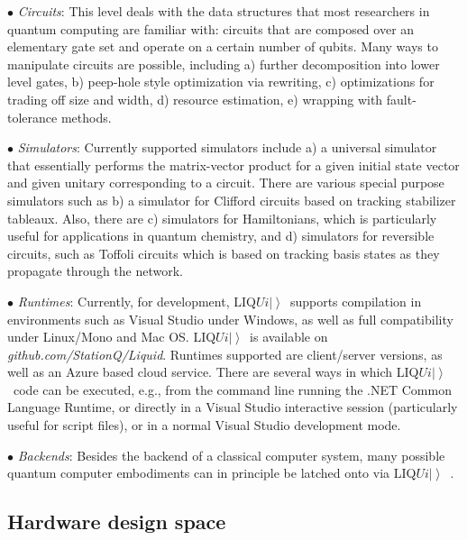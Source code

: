 \documentclass[conference]{IEEEtran}
\newcommand{\ket}[1]{\left| #1\right\rangle}        %
\newcommand{\Liquid}{LIQ$Ui\ket{}$\ }
\begin{document}
\noindent $\bullet$ {\em Circuits}: This level deals with the data structures that most researchers in quantum computing are familiar with: circuits that are composed over an elementary gate set and operate on a certain number of qubits. Many ways to manipulate circuits are possible, including a) further decomposition into lower level gates, b) peep-hole style optimization via rewriting, c) optimizations for trading off size and width, d) resource estimation, e) wrapping with fault-tolerance methods. 


\noindent $\bullet$ {\em Simulators}: Currently supported simulators include a) a universal simulator that essentially performs the matrix-vector product for a given initial state vector and given unitary corresponding to a circuit. %
There are various special purpose simulators such as b) a simulator for Clifford circuits based on tracking stabilizer tableaux. Also, there are c) simulators for Hamiltonians, which is particularly useful for applications in quantum chemistry, and d) simulators for reversible circuits, such as Toffoli circuits which is based on tracking basis states as they propagate through the network. 

\noindent $\bullet$ {\em Runtimes}: Currently, for development, \Liquid supports compilation in environments such as Visual Studio under Windows, as well as full compatibility under Linux/Mono and Mac OS. \Liquid is available on {\it github.com/StationQ/Liquid}. Runtimes supported are client/server versions, as well as an Azure based cloud service. There are several ways in which \Liquid code can be executed, e.g., from the command line running the .NET Common Language Runtime, or directly in a Visual Studio interactive session (particularly useful for script files), or in a normal Visual Studio development mode.


\noindent $\bullet$ {\em Backends}: Besides the backend of a classical computer system, many possible quantum computer embodiments can in principle be latched onto via \Liquid. 

\subsection{Hardware design space}
\end{document}
